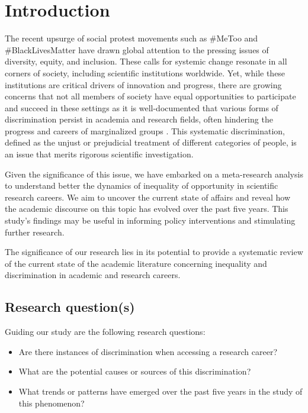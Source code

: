 \documentclass[runningheads]{llncs}
\begin{document}
\section{Introduction}
The recent upsurge of social protest movements such as \#MeToo \cite{joanpere2022history} and \#BlackLivesMatter \cite{nguyen2022black} have drawn global attention to the pressing issues of diversity, equity, and inclusion. These calls for systemic change resonate in all corners of society, including scientific institutions worldwide. Yet, while these institutions are critical drivers of innovation and progress, there are growing concerns that not all members of society have equal opportunities to participate and succeed in these settings as it is well-documented that various forms of discrimination persist in academia and research fields, often hindering the progress and careers of marginalized groups \cite{shor2015paper}. This systematic discrimination, defined as the unjust or prejudicial treatment of different categories of people, is an issue that merits rigorous scientific investigation.

Given the significance of this issue, we have embarked on a meta-research analysis to understand better the dynamics of inequality of opportunity in scientific research careers. We aim to uncover the current state of affairs and reveal how the academic discourse on this topic has evolved over the past five years. This study's findings may be useful in informing policy interventions and stimulating further research.

The significance of our research lies in its potential to provide a systematic review of the current state of the academic literature concerning inequality and discrimination in academic and research careers. 

\subsection{Research question(s)}
Guiding our study are the following research questions:
\begin{itemize}
\item Are there instances of discrimination when accessing a research career?
\item What are the potential causes or sources of this discrimination?
\item What trends or patterns have emerged over the past five years in the study of this phenomenon?
\end{itemize}
\end{document}
